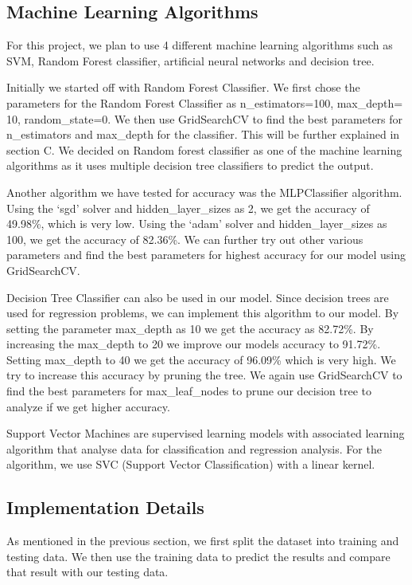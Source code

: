 \documentclass[11pt,conference]{IEEEtran}
\begin{document}
\subsection{Machine Learning Algorithms}
For this project, we plan to use 4 different machine learning algorithms such as SVM, Random Forest classifier, artificial neural networks and decision tree.\par
Initially we started off with Random Forest Classifier. We first chose the parameters for the Random Forest Classifier as n\_estimators=100, max\_depth= 10, random\_state=0. We then use GridSearchCV to find the best parameters for n\_estimators and max\_depth for the classifier. This will be further explained in section C. We decided on Random forest classifier as one of the machine learning algorithms as it uses multiple decision tree classifiers to predict the output.\par
Another algorithm we have tested for accuracy was the MLPClassifier algorithm. Using the ‘sgd’ solver and hidden\_layer\_sizes as 2, we get the accuracy of 49.98\%, which is very low. Using the ‘adam’ solver and hidden\_layer\_sizes as 100, we get the accuracy of 82.36\%. We can further try out other various parameters and find the best parameters for highest accuracy for our model using GridSearchCV. \par
Decision Tree Classifier can also be used in our model. Since decision trees are used for regression problems, we can implement this algorithm to our model. By setting the parameter max\_depth as 10 we get the accuracy as 82.72\%. By increasing the max\_depth to 20 we improve our models accuracy to 91.72\%. Setting max\_depth to 40 we get the accuracy of 96.09\% which is very high. We try to increase this accuracy by pruning the tree. We again use GridSearchCV to find the best parameters for max\_leaf\_nodes to prune our decision tree to analyze if we get higher accuracy.\par
Support Vector Machines are supervised learning models with associated learning algorithm that analyse data for classification and regression analysis. For the algorithm, we use SVC (Support Vector Classification) with a linear kernel.

\subsection{Implementation Details}
As mentioned in the previous section, we first split the dataset into
training and testing data. We then use the training data to predict the
results and compare that result with our testing data. \\
\end{document}
